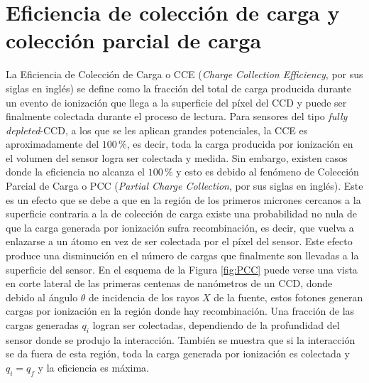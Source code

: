 \section{Eficiencia de colección de carga y colección parcial de carga}
\noindent La Eficiencia de Colección de Carga o CCE (\textit{Charge Collection Efficiency}, por sus siglas en inglés) se define como la fracción del total de carga producida durante un evento de ionización que llega a la superficie del píxel del CCD y puede ser finalmente colectada durante el proceso de lectura. Para sensores del tipo \textit{fully depleted}-CCD\cite{osti_838066}, a los que se les aplican grandes potenciales, la CCE es aproximadamente del $100\,\%$, es decir, toda la carga producida por ionización en el volumen del sensor logra ser colectada y medida. Sin embargo, existen casos donde la eficiencia no alcanza el $100\,\%$ y esto es debido al fenómeno de Colección Parcial de Carga o PCC (\textit{Partial Charge Collection}, por sus siglas en inglés)\cite{PCC-CCE}. Este es un efecto que se debe a que en la región de los primeros micrones cercanos a la superficie contraria a la de colección de carga existe una probabilidad no nula de que la carga generada por ionización sufra recombinación, es decir, que vuelva a enlazarse a un átomo en vez de ser colectada por el píxel del sensor. Este efecto produce una disminución en el número de cargas que finalmente son llevadas a la superficie del sensor. En el esquema de la Figura \ref{fig:PCC} puede verse una vista en corte lateral de las primeras centenas de nanómetros de un CCD, donde debido al ángulo $\theta$ de incidencia de los rayos $X$ de la fuente, estos fotones generan cargas por ionización en la región donde hay recombinación. Una fracción de las cargas generadas $q_{i}$ logran ser colectadas, dependiendo de la profundidad del sensor donde se produjo la interacción. También se muestra que si la interacción se da fuera de esta región, toda la carga generada por ionización es colectada y $q_{i} = q_{f}$ y la eficiencia es máxima.
